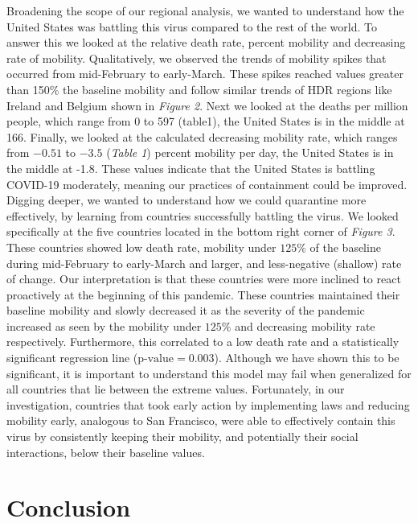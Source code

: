 \documentclass[11pt, english]{article}
\begin{document}
Broadening the scope of our regional analysis, we wanted to understand how the United States was battling this virus compared to the rest of the world. To answer this we looked at the relative death rate, percent mobility and decreasing rate of mobility. Qualitatively, we observed the trends of mobility spikes that occurred from mid-February to early-March. These spikes reached values greater than 150\% the baseline mobility and follow similar trends of HDR regions like Ireland and Belgium shown in \textit{Figure 2}. Next we looked at the deaths per million people, which range from 0 to 597 (table1), the United States is in the middle at 166. Finally, we looked at the calculated decreasing mobility rate, which ranges from $-0.51$ to $-3.5$ (\textit{Table 1}) percent mobility per day, the United States is in the middle at -1.8. These values indicate that the United States is battling COVID-19 moderately, meaning our practices of containment could be improved. Digging deeper, we wanted to understand how we could quarantine more effectively, by learning from countries successfully battling the virus. We looked specifically at the five countries located in the bottom right corner of \textit{Figure 3}. These countries showed low death rate, mobility under $125\%$ of the baseline during mid-February to early-March and larger, and less-negative (shallow) rate of change. Our interpretation is that these countries were more inclined to react proactively at the beginning of this pandemic. These countries maintained their baseline mobility and slowly decreased it as the severity of the pandemic increased as seen by the mobility under $125\%$ and decreasing mobility rate respectively. Furthermore, this correlated to a low death rate and a statistically significant regression line ($\text{p-value} = 0.003$). Although we have shown this to be significant, it is important to understand this model may fail when generalized for all countries that lie between the extreme values. Fortunately, in our investigation, countries that took early action by implementing laws and reducing mobility early, analogous to San Francisco, were able to effectively contain this virus by consistently keeping their mobility, and potentially their social interactions, below their baseline values. 
\newpage
\section{Conclusion}
\end{document}
